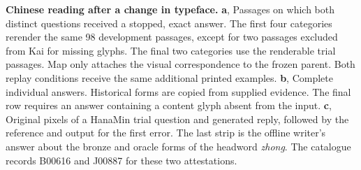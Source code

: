 \textbf{Chinese reading after a change in typeface.}
\textbf{a}, Passages on which both distinct questions received a stopped, exact answer. The first four categories rerender the same 98 development passages, except for two passages excluded from Kai for missing glyphs. The final two categories use the renderable trial passages. Map only attaches the visual correspondence to the frozen parent. Both replay conditions receive the same additional printed examples.
\textbf{b}, Complete individual answers. Historical forms are copied from supplied evidence. The final row requires an answer containing a content glyph absent from the input.
\textbf{c}, Original pixels of a HanaMin trial question and generated reply, followed by the reference and output for the first error. The last strip is the offline writer's answer about the bronze and oracle forms of the headword \textit{zhong}. The catalogue records B00616 and J00887 for these two attestations.
